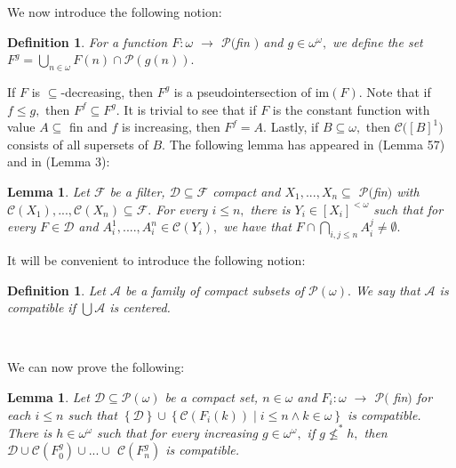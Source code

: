 \documentclass{article}%
\newtheorem{definition}[theorem]{Definition}
\newtheorem{lemma}[theorem]{Lemma}
\begin{document}
We now introduce the following notion:

\begin{definition}
For a function $F:\omega$ $\longrightarrow$ $\mathcal{P(}$\textsf{fin}%
$\mathsf{)}$ and $g\in\omega^{\omega},$ we define the set $F^{g}=%
{\textstyle\bigcup\limits_{n\in\omega}}
F\left(  n\right)  \cap\mathcal{P}\left(  g\left(  n\right)  \right)  .$
\end{definition}

If $F$ is $\subseteq$-decreasing, then $F^{g}$ is a pseudointersection of
\textsf{im}$\left(  F\right)  .$ Note that if $f\leq g,$ then $F^{f}\subseteq
F^{g}.$ It is trivial to see that if $F$ is the constant function with value
$A\subseteq$ \textsf{fin} and $f$ is increasing, then $F^{f}=A.$ Lastly, if
$B\subseteq\omega,$ then $\mathcal{C(}\left[  B\right]  ^{1})$ consists of all
supersets of $B.$ The following lemma has appeared in \cite{uanda} (Lemma 57)
and in \cite{CanjarFiltersII} (Lemma 3):

\begin{lemma}
Let $\mathcal{F}$ be a filter, $\mathcal{D\subseteq F}$ compact and
$X_{1},...,X_{n}\subseteq$ $\mathcal{P(}$\textsf{fin}$\mathsf{)}$ with
$\mathcal{C}\left(  X_{1}\right)  ,...,\mathcal{C}\left(  X_{n}\right)
\subseteq\mathcal{F}.$ For every $i\leq n,$ there is $Y_{i}\in\left[
X_{i}\right]  ^{<\omega}$ such that for every $F\in\mathcal{D}$ and $A_{i}%
^{1},....,A_{i}^{n}\in\mathcal{C}\left(  Y_{i}\right)  ,$ we have that $F\cap%
{\textstyle\bigcap\limits_{i,j\leq n}}
A_{i}^{j}\neq\emptyset.$ \label{Lema para adecuada strong p point}
\end{lemma}

It will be convenient to introduce the following notion:

\begin{definition}
Let $\mathcal{A}$ be a family of compact subsets of $\mathcal{P}\left(
\omega\right)  .$ We say that $\mathcal{A}$ \emph{is compatible }if $%
{\textstyle\bigcup}
\mathcal{A}$ is centered.
\end{definition}

\qquad\qquad\ \ 

We can now prove the following:

\begin{lemma}
Let $\mathcal{D\subseteq P}\left(  \omega\right)  $ be a compact set,
$n\in\omega$ and $F_{i}:\omega$ $\longrightarrow$ $\mathcal{P(}$%
\textsf{fin}$\mathsf{)}$ for each $i\leq n$ such that $\left\{  \mathcal{D}%
\right\}  \cup\left\{  \mathcal{C}\left(  F_{i}\left(  k\right)  \right)  \mid
i\leq n\wedge k\in\omega\right\}  $ is compatible. There is $h\in
\omega^{\omega}$ such that for every increasing $g\in\omega^{\omega},$ if
$g\nleq^{\ast}h,$ then $\mathcal{D\cup C}\left(  F_{0}^{g}\right)  \cup
...\cup$ $\mathcal{C}\left(  F_{n}^{g}\right)  $ is compatible.
\label{adecuada para strong ppoint}
\end{lemma}
\end{document}
